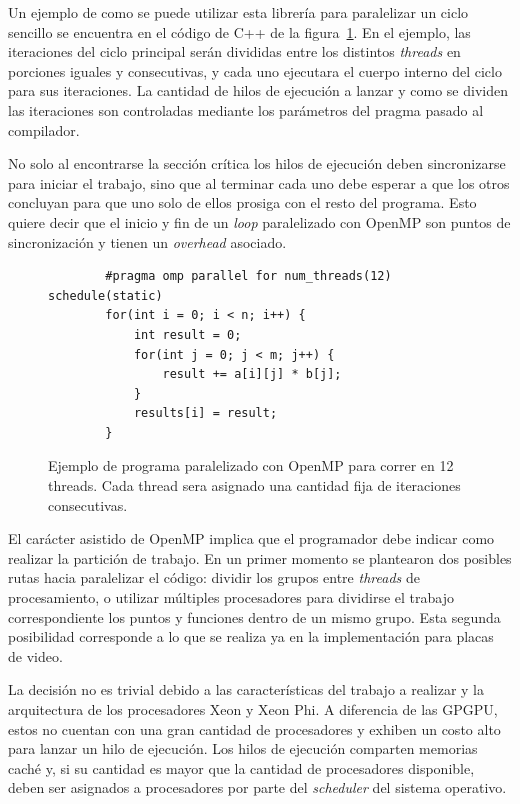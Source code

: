 Un ejemplo de como se puede utilizar esta librer\'ia para paralelizar un ciclo
sencillo se encuentra en el c\'odigo de C++ de la figura~\ref{fig:openmp-example}.
En el ejemplo, las iteraciones del ciclo principal ser\'an divididas entre los
distintos \textit{threads} en porciones iguales y consecutivas, y cada uno
ejecutara el cuerpo interno del ciclo para sus iteraciones. La cantidad de
hilos de ejecuci\'on a lanzar y como se dividen las iteraciones son controladas
mediante los par\'ametros del pragma pasado al compilador.

No solo al encontrarse la secci\'on cr\'itica los hilos de ejecuci\'on deben
sincronizarse para iniciar el trabajo, sino que al terminar cada uno debe esperar
a que los otros concluyan para que uno solo de ellos prosiga con el resto del
programa. Esto quiere decir que el inicio y fin de un \textit{loop} paralelizado
con OpenMP son puntos de sincronizaci\'on y tienen un \textit{overhead} asociado.

\begin{figure}[htbp]
    \begin{lstlisting}
        #pragma omp parallel for num_threads(12) schedule(static)
        for(int i = 0; i < n; i++) {
            int result = 0;
            for(int j = 0; j < m; j++) {
                result += a[i][j] * b[j];
            }
            results[i] = result;
        }
    \end{lstlisting}
    \caption{Ejemplo de programa paralelizado con OpenMP para correr en 12 threads. Cada thread
    sera asignado una cantidad fija de iteraciones consecutivas.}
    \label{fig:openmp-example}
\end{figure}

El car\'acter asistido de OpenMP implica que el programador debe indicar como
realizar la partici\'on de trabajo. En un primer momento se plantearon dos posibles rutas
hacia paralelizar el c\'odigo: dividir los grupos entre \textit{threads} de
procesamiento, o utilizar m\'ultiples procesadores para dividirse el trabajo
correspondiente los puntos y funciones dentro de un mismo grupo. Esta segunda
posibilidad corresponde a lo que se realiza ya en la implementaci\'on para placas
de video.

La decisi\'on no es trivial debido a las caracter\'isticas del trabajo a realizar
y la arquitectura de los procesadores Xeon y Xeon Phi. A diferencia de las GPGPU,
estos no cuentan con una gran cantidad de procesadores y exhiben un costo alto
para lanzar un hilo de ejecuci\'on. Los hilos de ejecuci\'on comparten memorias
cach\'e y, si su cantidad es mayor que la cantidad de procesadores disponible,
deben ser asignados a procesadores por parte del \textit{scheduler} del sistema
operativo.

